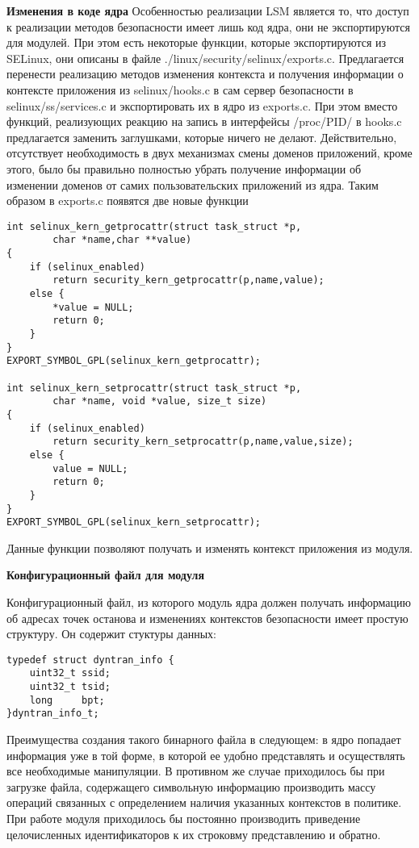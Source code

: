 {\bfseries Изменения в коде ядра}
Особенностью реализации LSM является то, 
что доступ к реализации методов безопасности 
имеет лишь код ядра, они не экспортируются для 
модулей. При этом есть некоторые функции, 
которые экспортируются из SELinux, они описаны 
в файле ./linux/security/selinux/exports.c. 
Предлагается перенести реализацию методов
изменения контекста и получения информации 
о контексте приложения из selinux/hooks.c в 
сам сервер безопасности в selinux/ss/services.c
и экспортировать их в ядро из exports.c. При этом
вместо функций, реализующих реакцию на запись 
в интерфейсы /proc/PID/ в hooks.c предлагается 
заменить заглушками, которые ничего не делают. 
Действительно, отсутствует необходимость в 
двух механизмах смены доменов приложений, 
кроме этого, было бы правильно полностью 
убрать получение информации об изменении 
доменов от самих пользовательских приложений
из ядра. Таким образом в exports.c появятся две 
новые функции 

\bigskip 
\begin{lstlisting}
int selinux_kern_getprocattr(struct task_struct *p,
		char *name,char **value)
{
	if (selinux_enabled)
		return security_kern_getprocattr(p,name,value);
	else {
		*value = NULL;
		return 0;
	}
}
EXPORT_SYMBOL_GPL(selinux_kern_getprocattr);

int selinux_kern_setprocattr(struct task_struct *p, 
		char *name, void *value, size_t size)
{
	if (selinux_enabled)
		return security_kern_setprocattr(p,name,value,size);
	else {
		value = NULL;
		return 0;
	}
}
EXPORT_SYMBOL_GPL(selinux_kern_setprocattr);
\end{lstlisting} 

\bigskip 
Данные функции позволяют получать и 
изменять контекст приложения из модуля. 

\bigskip 
{\bfseries Конфигурационный файл для модуля} 

Конфигурационный файл, из которого модуль ядра должен получать 
информацию об адресах точек останова и изменениях контекстов 
безопасности имеет простую структуру. Он содержит стуктуры данных: 

\bigskip 
\begin{lstlisting} 
typedef struct dyntran_info {
	uint32_t ssid;
	uint32_t tsid; 
	long 	 bpt;
}dyntran_info_t;
\end{lstlisting}

\bigskip
Преимущества создания такого бинарного файла в следующем: 
в ядро попадает информация уже в той форме, в которой 
ее удобно представлять и осуществлять все необходимые 
манипуляции. В противном же случае приходилось бы при загрузке
файла, содержащего символьную информацию производить 
массу операций связанных с определением наличия указанных
контекстов в политике. При работе модуля приходилось бы 
постоянно производить приведение целочисленных идентификаторов
к их строковму представлению и обратно. 

